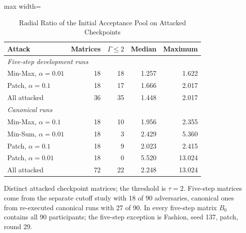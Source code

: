 \begin{table}[!t]
\centering\footnotesize
\setlength{\tabcolsep}{4pt}
\caption{Radial Ratio of the Initial Acceptance Pool on Attacked Checkpoints}\label{tab:gamma}
\begin{adjustbox}{max width=\columnwidth}
\begin{tabular}{lrrrr}
\toprule
Attack & Matrices & $\Gamma\leq2$ & Median & Maximum \\
\midrule
\multicolumn{5}{l}{\emph{Five-step development runs}} \\
Min-Max, $\alpha=0.01$ & 18 & 18 & 1.257 & 1.622 \\
Patch, $\alpha=0.1$ & 18 & 17 & 1.666 & 2.017 \\
All attacked & 36 & 35 & 1.448 & 2.017 \\
\midrule
\multicolumn{5}{l}{\emph{Canonical runs}} \\
Min-Max, $\alpha=0.1$ & 18 & 10 & 1.956 & 2.355 \\
Min-Sum, $\alpha=0.01$ & 18 & 3 & 2.429 & 5.360 \\
Patch, $\alpha=0.1$ & 18 & 9 & 2.023 & 2.415 \\
Patch, $\alpha=0.01$ & 18 & 0 & 5.520 & 13.024 \\
All attacked & 72 & 22 & 2.248 & 13.024 \\
\bottomrule
\end{tabular}
\end{adjustbox}

\par\vspace{3pt}\parbox{\linewidth}{\footnotesize Distinct attacked checkpoint matrices; the threshold is $\tau=2$. Five-step matrices come from the separate cutoff study with 18 of 90 adversaries, canonical ones from re-executed canonical runs with 27 of 90. In every five-step matrix $B_0$ contains all 90 participants; the five-step exception is Fashion, seed 137, patch, round 29.}
\end{table}
